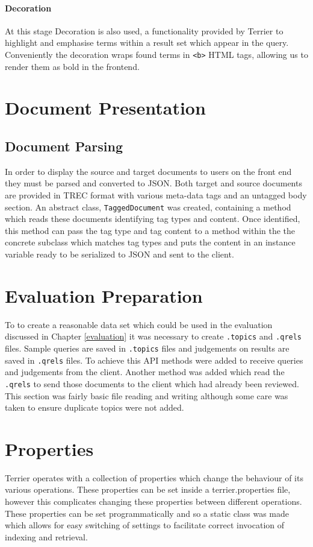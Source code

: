 \documentclass{l4proj}
\newcommand{\code}[1]{\texttt{#1}}
\begin{document}
\paragraph{Decoration} \label{server_decoration}
At this stage Decoration is also used, a functionality provided by Terrier to highlight and emphasise terms within a result set which appear in the query. Conveniently the decoration wraps found terms in \code{<b>} HTML tags, allowing us to render them as bold in the frontend.

\section{Document Presentation}
\subsection{Document Parsing} \label{docparse}
In order to display the source and target documents to users on the front end they must be parsed and converted to JSON.
Both target and source documents are provided in TREC format with various meta-data tags and an untagged body section.
An abstract class, \code{TaggedDocument} was created, containing a method which reads these documents identifying tag types and content. Once identified, this method can pass the tag type and tag content to a method within the the concrete subclass which matches tag types and puts the content in an instance variable ready to be serialized to JSON and sent to the client.

\section{Evaluation Preparation}
To to create a reasonable data set which could be used in the evaluation discussed in Chapter \ref{evaluation} it was necessary to create \code{.topics} and \code{.qrels} files. Sample queries are saved in \code{.topics} files and judgements on results are saved in \code{.qrels} files.
To achieve this API methods were added to receive queries and judgements from the client. Another method was added which read the \code{.qrels} to send those documents to the client which had already been reviewed.
This section was fairly basic file reading and writing although some care was taken to ensure duplicate topics were not added.

\section{Properties}
Terrier operates with a collection of properties which change the behaviour of its various operations. These properties can be set inside a terrier.properties file, however this complicates changing these properties between different operations. These properties can be set programmatically and so a static class was made which allows for easy switching of settings to facilitate correct invocation of indexing and retrieval.
\end{document}
